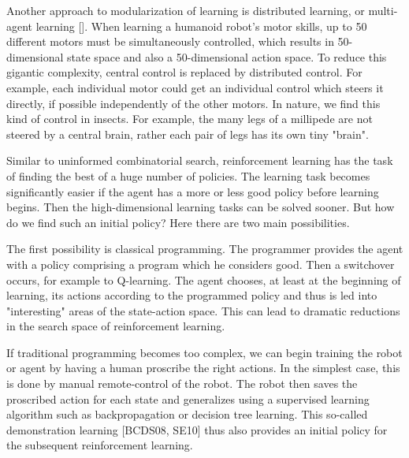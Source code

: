 \documentclass[10pt]{article}
\begin{document}
Another approach to modularization of learning is distributed learning, or multi-agent learning [\cite{panait2005cooperative}]. When learning a humanoid robot's motor skills, up to 50 different motors must be simultaneously controlled, which results in 50-dimensional state space and also a 50-dimensional action space. To reduce this gigantic complexity, central control is replaced by distributed control. For example, each individual motor could get an individual control which steers it directly, if possible independently of the other motors. In nature, we find this kind of control in insects. For example, the many legs of a millipede are not steered by a central brain, rather each pair of legs has its own tiny "brain".

Similar to uninformed combinatorial search, reinforcement learning has the task of finding the best of a huge number of policies. The learning task becomes significantly easier if the agent has a more or less good policy before learning begins. Then the high-dimensional learning tasks can be solved sooner. But how do we find such an initial policy? Here there are two main possibilities.

The first possibility is classical programming. The programmer provides the agent with a policy comprising a program which he considers good. Then a switchover occurs, for example to Q-learning. The agent chooses, at least at the beginning of learning, its actions according to the programmed policy and thus is led into "interesting" areas of the state-action space. This can lead to dramatic reductions in the search space of reinforcement learning.

If traditional programming becomes too complex, we can begin training the robot or agent by having a human proscribe the right actions. In the simplest case, this is done by manual remote-control of the robot. The robot then saves the proscribed action for each state and generalizes using a supervised learning algorithm such as backpropagation or decision tree learning. This so-called demonstration learning [BCDS08, SE10] thus also provides an initial policy for the subsequent reinforcement learning.
\end{document}
